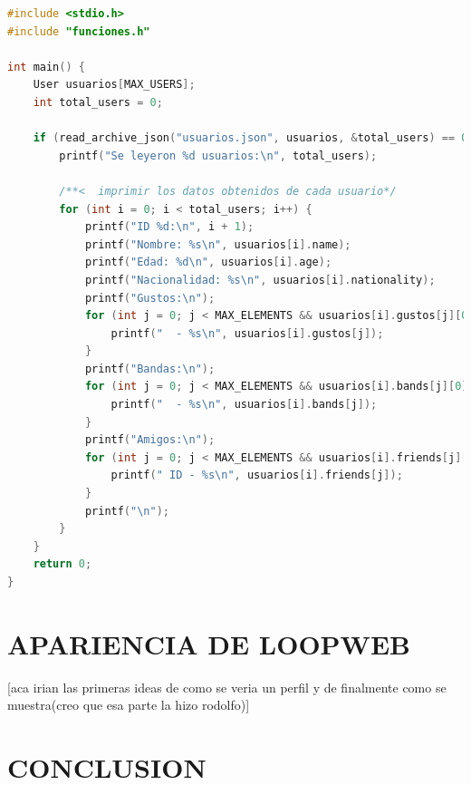 \begin{lstlisting}[style=CodeStyle, language=C, caption={main.c}, label={lst:codigo}]
#include <stdio.h>
#include "funciones.h"

int main() {
    User usuarios[MAX_USERS];
    int total_users = 0;

    if (read_archive_json("usuarios.json", usuarios, &total_users) == 0) {
        printf("Se leyeron %d usuarios:\n", total_users);

        /**<  imprimir los datos obtenidos de cada usuario*/
        for (int i = 0; i < total_users; i++) {
            printf("ID %d:\n", i + 1);
            printf("Nombre: %s\n", usuarios[i].name);
            printf("Edad: %d\n", usuarios[i].age);
            printf("Nacionalidad: %s\n", usuarios[i].nationality);
            printf("Gustos:\n");
            for (int j = 0; j < MAX_ELEMENTS && usuarios[i].gustos[j][0]; j++) {
                printf("  - %s\n", usuarios[i].gustos[j]);
            }
            printf("Bandas:\n");
            for (int j = 0; j < MAX_ELEMENTS && usuarios[i].bands[j][0]; j++) {
                printf("  - %s\n", usuarios[i].bands[j]);
            }
            printf("Amigos:\n");
            for (int j = 0; j < MAX_ELEMENTS && usuarios[i].friends[j][0]; j++) {
                printf(" ID - %s\n", usuarios[i].friends[j]);
            }
            printf("\n");
        }
    }
    return 0;
}

\end{lstlisting}

\section{APARIENCIA DE LOOPWEB}
[aca irian las primeras ideas de como se veria un perfil y de finalmente como se muestra(creo que esa parte la hizo rodolfo)]


\section{CONCLUSION}
